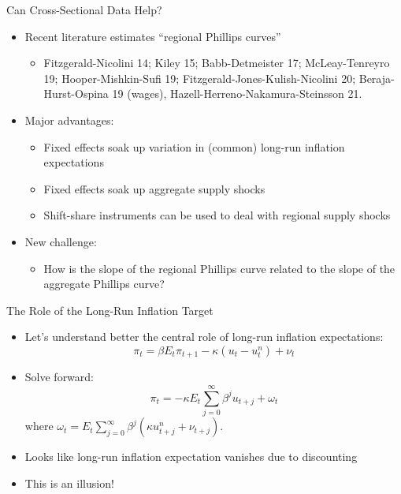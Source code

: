 \documentclass[11pt,aspectratio=169,xcolor={dvipsnames},hyperref={pdftex,pdfpagemode=UseNone,hidelinks,pdfdisplaydoctitle=true},usepdftitle=false]{beamer}
\begin{document}
\begin{frame}{Can Cross-Sectional Data Help?}
	\begin{itemize}
		\itemsep1em
		\item Recent literature estimates ``regional Phillips curves''
		\begin{itemize}
			\item Fitzgerald-Nicolini 14; Kiley 15; Babb-Detmeister 17; McLeay-Tenreyro 19; Hooper-Mishkin-Sufi 19; Fitzgerald-Jones-Kulish-Nicolini 20; Beraja-Hurst-Ospina 19 (wages), Hazell-Herreno-Nakamura-Steinsson 21.
		\end{itemize}
		\item Major advantages:
		\begin{itemize}
			\item Fixed effects soak up variation in (common) long-run inflation expectations
			\item Fixed effects soak up aggregate supply shocks
			\item Shift-share instruments can be used to deal with regional supply shocks
		\end{itemize}
		\item New challenge:
		\begin{itemize}
			\item How is the slope of the regional Phillips curve related to the slope of the aggregate Phillips curve? 
		\end{itemize}
	\end{itemize}
\end{frame}

\begin{frame}{The Role of the Long-Run Inflation Target}
	\begin{itemize}
		\itemsep1em 
		\item Let's understand better the central role of long-run inflation expectations:
		\[\pi_{t}=\beta E_{t}\pi_{t+1}-\kappa (u_{t} - u_t^n)  + \nu_{t}  \]
		\item Solve forward:
		\[\pi_{t}=-\kappa E_{t}\sum_{j=0}^{\infty}\beta^{j} u_{t+j} + \omega_{t}\]
		where $\omega_t = E_t\sum_{j=0}^{\infty}\beta^{j}(\kappa u_{t+j}^{n} + \nu_{t+j})$. 
		\item Looks like long-run inflation expectation vanishes due to discounting
		\item This is an illusion!
	\end{itemize}
\end{frame}	 
\end{document}
